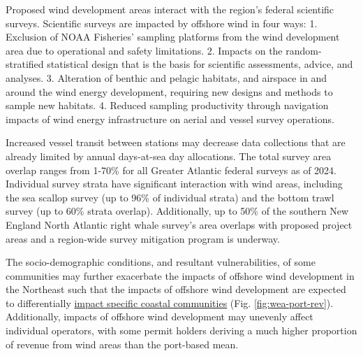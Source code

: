 \documentclass[
  10pt,
]{article}
\begin{document}
Proposed wind development areas interact with the region's federal scientific surveys. Scientific surveys are impacted by offshore wind in four ways:
1. Exclusion of NOAA Fisheries' sampling platforms from the wind development area due to operational and safety limitations.
2. Impacts on the random-stratified statistical design that is the basis for scientific assessments, advice, and analyses.
3. Alteration of benthic and pelagic habitats, and airspace in and around the wind energy development, requiring new designs and methods to sample new habitats.
4. Reduced sampling productivity through navigation impacts of wind energy infrastructure on aerial and vessel survey operations.

Increased vessel transit between stations may decrease data collections that are already limited by annual days-at-sea day allocations. The total survey area overlap ranges from 1-70\% for all Greater Atlantic federal surveys as of 2024. Individual survey strata have significant interaction with wind areas, including the sea scallop survey (up to 96\% of individual strata) and the bottom trawl survey (up to 60\% strata overlap). Additionally, up to 50\% of the southern New England North Atlantic right whale survey's area overlaps with proposed project areas and a region-wide survey mitigation program is underway.

The socio-demographic conditions, and resultant vulnerabilities, of some communities may further exacerbate the impacts of offshore wind development in the Northeast such that the impacts of offshore wind development are expected to differentially \href{https://noaa-edab.github.io/catalog/wind_port.html}{impact specific coastal communities} (Fig. \ref{fig:wea-port-rev}). Additionally, impacts of offshore wind development may unevenly affect individual operators, with some permit holders deriving a much higher proportion of revenue from wind areas than the port-based mean.
\end{document}
